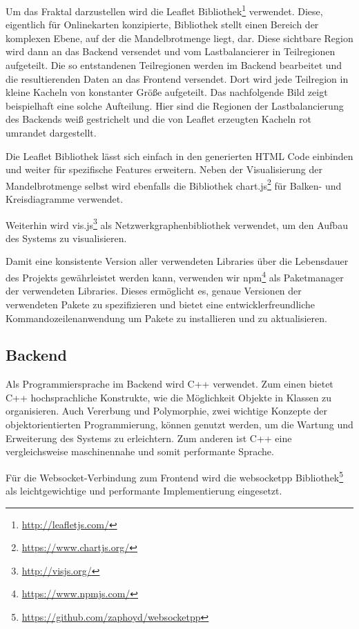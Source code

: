Um das Fraktal darzustellen wird die Leaflet Bibliothek\footnote{\url{http://leafletjs.com/}} verwendet. Diese, eigentlich für Onlinekarten konzipierte, Bibliothek stellt einen Bereich der komplexen Ebene, auf der die Mandelbrotmenge liegt, dar. Diese sichtbare Region wird dann an das Backend versendet und vom Lastbalancierer  in Teilregionen aufgeteilt. Die so entstandenen Teilregionen werden im Backend bearbeitet und die resultierenden Daten an das Frontend versendet. Dort wird jede Teilregion in kleine Kacheln von konstanter Größe aufgeteilt. Das nachfolgende Bild zeigt beispielhaft eine solche Aufteilung. Hier sind die Regionen der Lastbalancierung des Backends weiß gestrichelt und die von Leaflet erzeugten Kacheln rot umrandet dargestellt.

Die Leaflet Bibliothek lässt sich einfach in den generierten HTML Code einbinden und weiter für spezifische Features erweitern.
Neben der Visualisierung der Mandelbrotmenge selbst wird ebenfalls die Bibliothek chart.js\footnote{\url{https://www.chartjs.org/}} für Balken- und Kreisdiagramme verwendet.

Weiterhin wird vis.js\footnote{\url{http://visjs.org/}} als Netzwerkgraphenbibliothek verwendet, um den Aufbau des Systems zu visualisieren. 

Damit eine konsistente Version aller verwendeten Libraries über die Lebensdauer des Projekts gewährleistet werden kann, verwenden wir npm\footnote{\url{https://www.npmjs.com/}} als Paketmanager der verwendeten Libraries. Dieses ermöglicht es, genaue Versionen der verwendeten Pakete zu spezifizieren und bietet eine entwicklerfreundliche Kommandozeilenanwendung um Pakete zu installieren und zu aktualisieren.

\subsection{Backend}


Als Programmiersprache im Backend wird C++ verwendet. Zum einen bietet C++ hochsprachliche Konstrukte, wie die Möglichkeit Objekte in Klassen zu organisieren. Auch Vererbung und Polymorphie, zwei wichtige Konzepte der objektorientierten Programmierung, können genutzt werden, um die Wartung und Erweiterung des Systems zu erleichtern. Zum anderen ist C++ eine vergleichsweise maschinennahe und somit performante Sprache.

Für die Websocket-Verbindung zum Frontend wird die websocketpp Bibliothek\footnote{\url{https://github.com/zaphoyd/websocketpp}} als leichtgewichtige und performante Implementierung eingesetzt.


